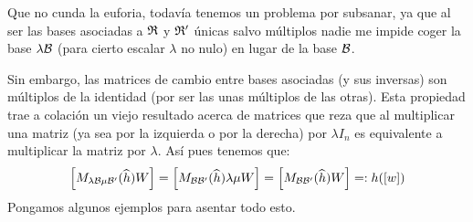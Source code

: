 Que no cunda la euforia, todavía tenemos un problema por subsanar, ya que al ser las bases asociadas a $\mathfrak{R}$ y $\mathfrak{R}'$ únicas salvo múltiplos nadie me impide coger la base $\lambda\mathcal{B}$ (para cierto escalar $\lambda$ no nulo) en lugar de la base $\mathcal{B}$.

Sin embargo, las matrices de cambio entre bases asociadas (y sus inversas) son múltiplos de la identidad (por ser las unas múltiplos de las otras). Esta propiedad trae a colación un viejo resultado acerca de matrices que reza que al multiplicar una matriz (ya sea por la izquierda o por la derecha) por $\lambda I_n$ es equivalente a multiplicar la matriz por $\lambda$. Así pues tenemos que:
\begin{equation}
	\left [ M_{\lambda \mathcal{B}\mu\mathcal{B}'}(\widehat{h})W \right ]=\left [ M_{\mathcal{B}\mathcal{B}'}(\widehat{h})\lambda\mu W \right ]=\left [ M_{\mathcal{B}\mathcal{B}'}(\widehat{h})W \right ]=:h(\left [ w \right ])
\end{equation}
Pongamos algunos ejemplos para asentar todo esto.
